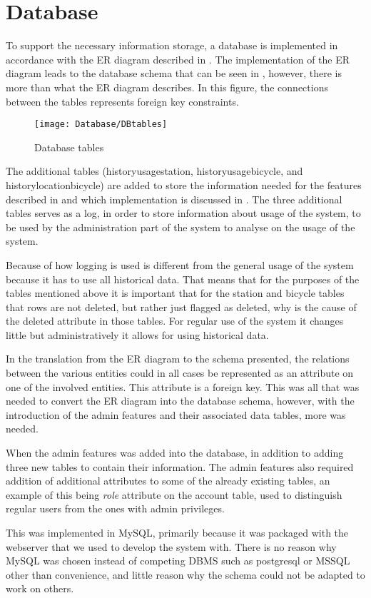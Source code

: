 \section{Database}
To support the necessary information storage, a database is implemented in accordance with the ER diagram described in .
The implementation of the ER diagram leads to the database schema that can be seen in , however, there is more than what the ER diagram describes.
In this figure, the connections between the tables represents foreign key constraints.

\begin{figure}[h]
	\centering
	\texttt{[image: Database/DBtables]}
	\caption{Database tables}\label{fig:Database-tables}
\end{figure}

The additional tables (historyusagestation, historyusagebicycle, and historylocationbicycle) are added to store the information needed for the features described in  and which implementation is discussed in .
The three additional tables serves as a log, in order to store information about usage of the system, to be used by the administration part of the system to analyse on the usage of the system.

Because of how logging is used is different from the general usage of the system because it has to use all historical data.
That means that for the purposes of the tables mentioned above it is important that for the station and bicycle tables that rows are not deleted, but rather just flagged as deleted, why is the cause of the deleted attribute in those tables. 
For regular use of the system it changes little but administratively it allows for using historical data.

In the translation from the ER diagram to the schema presented, the relations between the various entities could in all cases be represented as an attribute on one of the involved entities.
This attribute is a foreign key.
This was all that was needed to convert the ER diagram into the database schema, however, with the introduction of the admin features and their associated data tables, more was needed.

When the admin features was added into the database, in addition to adding three new tables to contain their information.
The admin features also required addition of additional attributes to some of the already existing tables, an example of this being \textit{role} attribute on the account table, used to distinguish regular users from the ones with admin privileges.

This was implemented in MySQL, primarily because it was packaged with the webserver that we used to develop the system with.
There is no reason why MySQL was chosen instead of competing DBMS such as postgresql or MSSQL other than convenience, and little reason why the schema could not be adapted to work on others.
